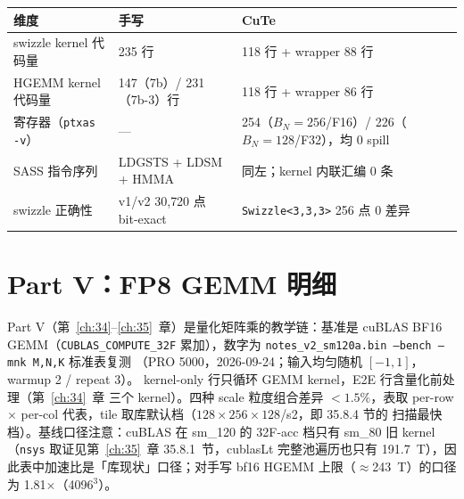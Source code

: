 \begin{center}\small
\begin{tabular}{llp{6.2cm}}
\toprule
维度 & 手写 & CuTe \\
\midrule
swizzle kernel 代码量 & 235 行 & 118 行 + wrapper 88 行 \\
HGEMM kernel 代码量 & 147（7b）/ 231（7b-3）行 & 118 行 + wrapper 86 行 \\
寄存器（\texttt{ptxas -v}） & — & 254（$B_N{=}256$/F16）/ 226（$B_N{=}128$/F32），均 0 spill \\
SASS 指令序列 & LDGSTS + LDSM + HMMA & 同左；kernel 内联汇编 0 条 \\
swizzle 正确性 & v1/v2 30{,}720 点 bit-exact & \texttt{Swizzle\allowbreak{}<3,\allowbreak{}3,\allowbreak{}3>} 256 点 0 差异 \\
\bottomrule
\end{tabular}
\end{center}

\section{Part V：FP8 GEMM 明细}

Part V（第~\ref{ch:34}--\ref{ch:35}~章）是量化矩阵乘的教学链：基准是
cuBLAS BF16 GEMM（\texttt{CUBLAS\_COMPUTE\_32F} 累加），数字为
\texttt{notes\_v2\_sm120a.bin --bench --mnk M,N,K} 标准表复测
（PRO 5000，2026-09-24；输入均匀随机 $[-1,1]$，warmup 2 / repeat 3）。
kernel-only 行只循环 GEMM kernel，E2E 行含量化前处理（第~\ref{ch:34}~章
三个 kernel）。四种 scale 粒度组合差异 $<1.5\%$，表取 per-row$\times$
per-col 代表，tile 取库默认档（$128\times256\times128$/s2，即 35.8.4 节的
扫描最快档）。基线口径注意：cuBLAS 在 sm\_120 的 32F-acc 档只有 sm\_80
旧 kernel（\texttt{nsys} 取证见第~\ref{ch:35}~章 35.8.1~节，cublasLt
完整池遍历也只有 191.7~T），因此表中加速比是「库现状」口径；对手写
bf16 HGEMM 上限（$\approx$243~T）的口径为 1.81$\times$（4096$^3$）。

